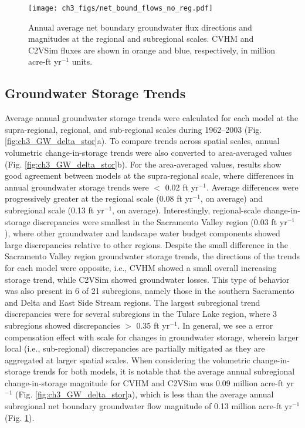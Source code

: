 \begin{figure}[ht!]
\centerline{\texttt{[image: ch3\_figs/net\_bound\_flows\_no\_reg.pdf]}}
\caption{Annual average net boundary groundwater flux directions and magnitudes at the regional and subregional scales. CVHM and C2VSim fluxes are shown in orange and blue, respectively, in million acre-ft yr$^{-1}$ units.}
\label{fig:ch3_GW_net_bound}
\end{figure}

\subsection{Groundwater Storage Trends}

Average annual groundwater storage trends were calculated for each model at the supra-regional, regional, and sub-regional scales during 1962--2003 (Fig. \ref{fig:ch3_GW_delta_stor}a). To compare trends across spatial scales, annual volumetric change-in-storage trends were also converted to area-averaged values (Fig. \ref{fig:ch3_GW_delta_stor}b). For the area-averaged values, results show good agreement between models at the supra-regional scale, where differences in annual groundwater storage trends were $<$ 0.02 ft yr$^{-1}$. Average differences were progressively greater at the regional scale (0.08  ft yr$^{-1}$, on average) and subregional scale (0.13 ft yr$^{-1}$, on average). Interestingly, regional-scale change-in-storage discrepancies were smallest in the Sacramento Valley region (0.03 ft yr$^{-1}$), where other groundwater and landscape water budget components showed large discrepancies relative to other regions. Despite the small difference in the Sacramento Valley region groundwater storage trends, the directions of the trends for each model were opposite, i.e., CVHM showed a small overall increasing storage trend, while C2VSim showed groundwater losses. This type of behavior was also present in 6 of 21 subregions, namely those in the southern Sacramento and Delta and East Side Stream regions. The largest subregional trend discrepancies were for several subregions in the Tulare Lake region, where 3 subregions showed discrepancies $>$ 0.35 ft yr$^{-1}$. In general, we see a error compensation effect with scale for changes in groundwater storage, wherein larger local (i.e., sub-regional) discrepancies are partially mitigated as they are aggregated at larger spatial scales. When considering the volumetric change-in-storage trends for both models, it is notable that the average annual subregional change-in-storage magnitude for CVHM and C2VSim was 0.09 million acre-ft yr$^{-1}$ (Fig. \ref{fig:ch3_GW_delta_stor}a), which is less than the average annual subregional net boundary groundwater flow magnitude of 0.13 million acre-ft yr$^{-1}$ (Fig. \ref{fig:ch3_GW_net_bound}).

